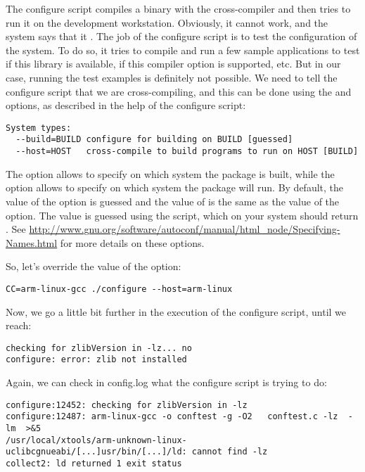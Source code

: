 The configure script compiles a binary with the cross-compiler and
then tries to run it on the development workstation. Obviously, it
cannot work, and the system says that it
. The job of the configure script is
to test the configuration of the system. To do so, it tries to compile
and run a few sample applications to test if this library is
available, if this compiler option is supported, etc. But in our case,
running the test examples is definitely not possible. We need to tell
the configure script that we are cross-compiling, and this can be done
using the  and  options, as described in
the help of the configure script:

\begin{verbatim}
System types:
  --build=BUILD	configure for building on BUILD [guessed]
  --host=HOST	cross-compile to build programs to run on HOST [BUILD]
\end{verbatim}

The  option allows to specify on which system the
package is built, while the  option allows to specify on
which system the package will run. By default, the value of the
 option is guessed and the value of  is the
same as the value of the  option. The value is guessed
using the  script, which on your system should
return . See
\url{http://www.gnu.org/software/autoconf/manual/html_node/Specifying-Names.html}
for more details on these options.

So, let's override the value of the  option:

\begin{verbatim}
CC=arm-linux-gcc ./configure --host=arm-linux
\end{verbatim}

Now, we go a little bit further in the execution of the configure
script, until we reach:

\begin{verbatim}
checking for zlibVersion in -lz... no
configure: error: zlib not installed
\end{verbatim}

Again, we can check in config.log what the configure script is trying
to do:

\footnotesize
\begin{verbatim}
configure:12452: checking for zlibVersion in -lz
configure:12487: arm-linux-gcc -o conftest -g -O2   conftest.c -lz  -lm  >&5
/usr/local/xtools/arm-unknown-linux-uclibcgnueabi/[...]usr/bin/[...]/ld: cannot find -lz
collect2: ld returned 1 exit status
\end{verbatim}
\normalsize

